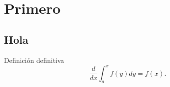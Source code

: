 \chapter{Primero}
\section{Hola}
\lipsum[1-3]
\begin{defn} Definición definitiva $$\frac{d}{dx}\int_a^xf(y)dy=f(x).$$\end{defn}

